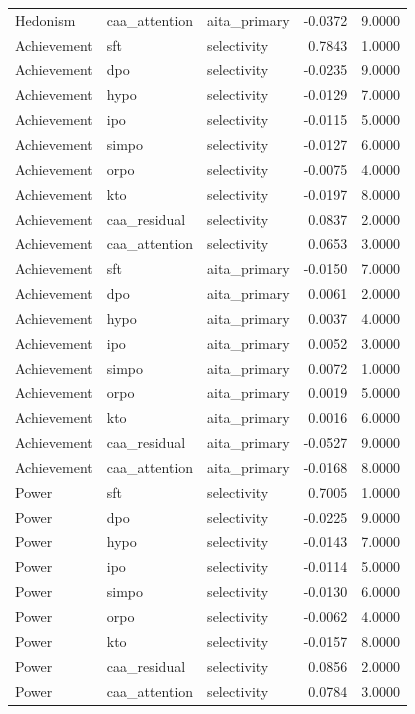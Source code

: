 \begin{tabular}{lllrr}
Hedonism & caa\_attention & aita\_primary & -0.0372 & 9.0000 \\
Achievement & sft & selectivity & 0.7843 & 1.0000 \\
Achievement & dpo & selectivity & -0.0235 & 9.0000 \\
Achievement & hypo & selectivity & -0.0129 & 7.0000 \\
Achievement & ipo & selectivity & -0.0115 & 5.0000 \\
Achievement & simpo & selectivity & -0.0127 & 6.0000 \\
Achievement & orpo & selectivity & -0.0075 & 4.0000 \\
Achievement & kto & selectivity & -0.0197 & 8.0000 \\
Achievement & caa\_residual & selectivity & 0.0837 & 2.0000 \\
Achievement & caa\_attention & selectivity & 0.0653 & 3.0000 \\
Achievement & sft & aita\_primary & -0.0150 & 7.0000 \\
Achievement & dpo & aita\_primary & 0.0061 & 2.0000 \\
Achievement & hypo & aita\_primary & 0.0037 & 4.0000 \\
Achievement & ipo & aita\_primary & 0.0052 & 3.0000 \\
Achievement & simpo & aita\_primary & 0.0072 & 1.0000 \\
Achievement & orpo & aita\_primary & 0.0019 & 5.0000 \\
Achievement & kto & aita\_primary & 0.0016 & 6.0000 \\
Achievement & caa\_residual & aita\_primary & -0.0527 & 9.0000 \\
Achievement & caa\_attention & aita\_primary & -0.0168 & 8.0000 \\
Power & sft & selectivity & 0.7005 & 1.0000 \\
Power & dpo & selectivity & -0.0225 & 9.0000 \\
Power & hypo & selectivity & -0.0143 & 7.0000 \\
Power & ipo & selectivity & -0.0114 & 5.0000 \\
Power & simpo & selectivity & -0.0130 & 6.0000 \\
Power & orpo & selectivity & -0.0062 & 4.0000 \\
Power & kto & selectivity & -0.0157 & 8.0000 \\
Power & caa\_residual & selectivity & 0.0856 & 2.0000 \\
Power & caa\_attention & selectivity & 0.0784 & 3.0000 \\

\end{tabular}
